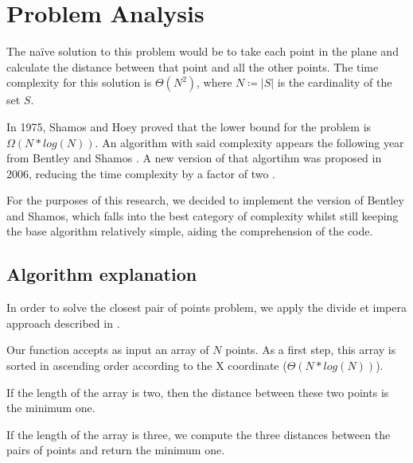 \section{Problem Analysis}
\label{sec:problem_analysis}

The na\"ive solution to this problem would be to take each point
in the plane and calculate the distance between that point and all
the other points. The time complexity for this solution is $\Theta(N^2)$,
where $N\coloneqq|S|$ is the cardinality of the set $S$.


In 1975, Shamos and Hoey proved that the lower bound for the problem is $\Omega(N * log(N))$\cite[§2, theorem 1]{closest_pair_definition}. An algorithm with said complexity appears
the following year from Bentley and Shamos \cite{divide_and_conq_3NlgN}.
A new version of that algortihm was proposed in 2006, reducing the time complexity by a factor of two \cite{ge2006improved}.

For the purposes of this research, we decided to implement the version of Bentley and Shamos, which falls into the best category of complexity whilst still keeping the base algorithm relatively simple, aiding the comprehension of the code.

\subsection{Algorithm explanation}

In order to solve the closest pair of points problem, we apply the divide et impera approach described in \cite{divide_and_conq_3NlgN}.

Our function accepts as input an array of $N$ points. As a first step, this array is sorted in ascending order according to the X coordinate ($\Theta(N*log(N))$).

If the length of the array is two, then the distance between these two points is the minimum one.

If the length of the array is three, we compute the three distances between the pairs of points and return the minimum one.


